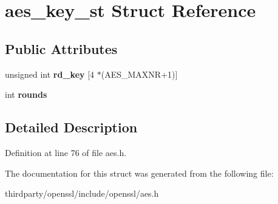 \hypertarget{structaes__key__st}{}\section{aes\+\_\+key\+\_\+st Struct Reference}
\label{structaes__key__st}
\subsection*{Public Attributes}
\begin{DoxyCompactItemize}
\item 
\mbox{\label{structaes__key__st_a4746bac89cfc3a3bc9c8bd6a8a47db59}} 
unsigned int {\bfseries rd\+\_\+key} \mbox{[}4 $\ast$(A\+E\+S\+\_\+\+M\+A\+X\+NR+1)\mbox{]}
\item 
\mbox{\label{structaes__key__st_aa87061a8d8d0b11de2933ee88cb91f18}} 
int {\bfseries rounds}
\end{DoxyCompactItemize}


\subsection{Detailed Description}


Definition at line 76 of file aes.\+h.



The documentation for this struct was generated from the following file\+:\begin{DoxyCompactItemize}
\item 
thirdparty/openssl/include/openssl/aes.\+h\end{DoxyCompactItemize}
